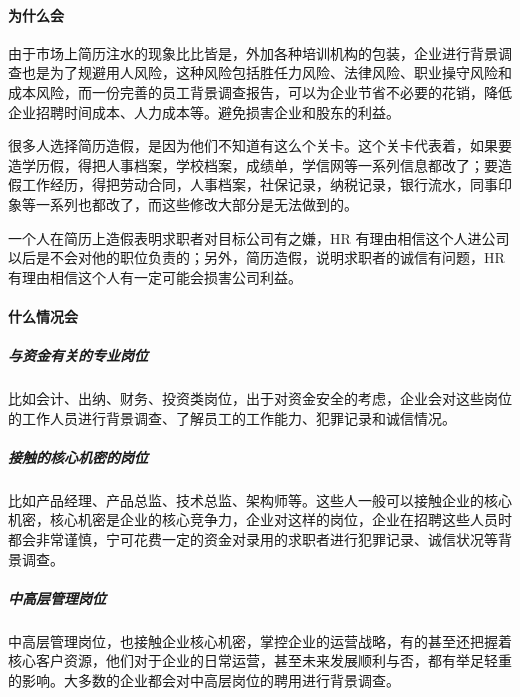 \documentclass[letterpaper,11pt,english]{sphinxmanual}
\begin{document}
\paragraph{为什么会}
\label{\detokenize{chapter_interview/background_survey:id3}}
由于市场上简历注水的现象比比皆是，外加各种培训机构的包装，企业进行背景调查也是为了规避用人风险，这种风险包括胜任力风险、法律风险、职业操守风险和成本风险，而一份完善的员工背景调查报告，可以为企业节省不必要的花销，降低企业招聘时间成本、人力成本等。避免损害企业和股东的利益。

很多人选择简历造假，是因为他们不知道有这么个关卡。这个关卡代表着，如果要造学历假，得把人事档案，学校档案，成绩单，学信网等一系列信息都改了；要造假工作经历，得把劳动合同，人事档案，社保记录，纳税记录，银行流水，同事印象等一系列也都改了，而这些修改大部分是无法做到的。

一个人在简历上造假表明求职者对目标公司有之嫌，HR
有理由相信这个人进公司以后是不会对他的职位负责的；另外，简历造假，说明求职者的诚信有问题，HR
有理由相信这个人有一定可能会损害公司利益。%
\begin{footnote}[813]\sphinxAtStartFootnote
{}
%
\end{footnote}


\paragraph{什么情况会}
\label{\detokenize{chapter_interview/background_survey:id4}}

\subparagraph{与资金有关的专业岗位}
\label{\detokenize{chapter_interview/background_survey:id5}}
比如会计、出纳、财务、投资类岗位，出于对资金安全的考虑，企业会对这些岗位的工作人员进行背景调查、了解员工的工作能力、犯罪记录和诚信情况。


\subparagraph{接触的核心机密的岗位}
\label{\detokenize{chapter_interview/background_survey:id6}}
比如产品经理、产品总监、技术总监、架构师等。这些人一般可以接触企业的核心机密，核心机密是企业的核心竞争力，企业对这样的岗位，企业在招聘这些人员时都会非常谨慎，宁可花费一定的资金对录用的求职者进行犯罪记录、诚信状况等背景调查。


\subparagraph{中高层管理岗位}
\label{\detokenize{chapter_interview/background_survey:id7}}
中高层管理岗位，也接触企业核心机密，掌控企业的运营战略，有的甚至还把握着核心客户资源，他们对于企业的日常运营，甚至未来发展顺利与否，都有举足轻重的影响。大多数的企业都会对中高层岗位的聘用进行背景调查。
\end{document}

